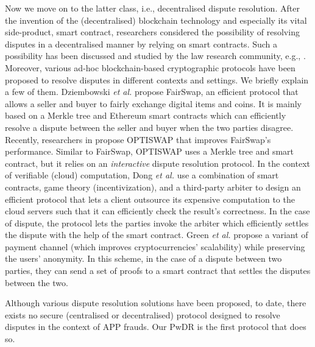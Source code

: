 Now we move on to the latter class, i.e., decentralised dispute resolution. After the invention of the (decentralised) blockchain technology and  especially its vital side-product, smart contract, researchers considered  the possibility of resolving disputes in a decentralised manner by relying on smart contracts. Such a possibility has been discussed and studied by the law research community, e.g., \cite{buchwald2019smart,ortolani2016self,ortolani2019impact}. Moreover,  various ad-hoc blockchain-based cryptographic protocols have been  proposed to resolve disputes in different contexts and settings. We briefly explain a few of them. Dziembowski \textit{et al.}  \cite{DziembowskiEF18} propose FairSwap, an efficient protocol that allows a seller and buyer to fairly exchange  digital items  and  coins. It is mainly based on a Merkle tree and Ethereum smart contracts which can efficiently resolve a dispute between the seller and buyer  when the two parties disagree. Recently, researchers in  \cite{EckeyFS20} propose OPTISWAP that improves FairSwap’s performance. Similar to FairSwap, OPTISWAP uses a Merkle tree and smart contract, but  it relies on an \emph{interactive} dispute resolution protocol. In the context of verifiable (cloud) computation, Dong \textit{et al.} \cite{DongWAMM17} use a combination of smart contracts, game theory (incentivization), and a   third-party arbiter to design an efficient protocol  that lets a client outsource its expensive computation to the cloud servers such that it can efficiently check the result's correctness. In the case of dispute, the protocol lets the parties  invoke the  arbiter which efficiently settles the dispute with the help of the smart contract. Green \textit{et al.} \cite{Bolt} propose a variant  of  payment channel \cite{Lightning-Network} (which improves cryptocurrencies' scalability) while preserving the users' anonymity. In this scheme, in the case of a dispute between two parties, they can send a set of proofs to a smart contract that settles the disputes between the two. 



 

Although various dispute resolution solutions have been proposed, to date, there exists no secure (centralised or decentralised) protocol  designed to resolve disputes in the context of APP frauds.  Our PwDR is the first protocol that does so. 

 



 


